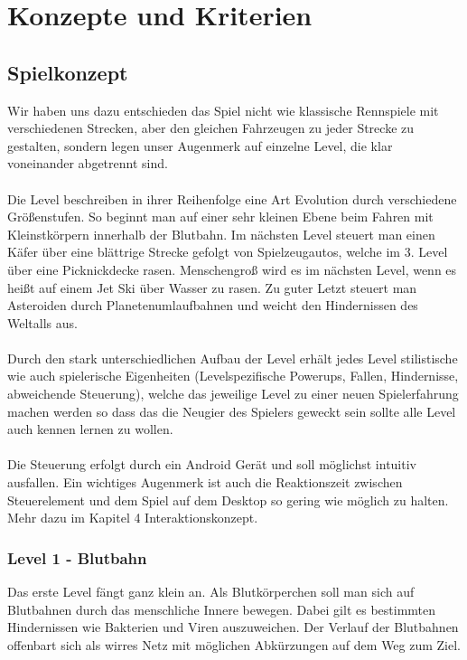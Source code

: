 ﻿\section{Konzepte und Kriterien}

\subsection{Spielkonzept}

Wir haben uns dazu entschieden das Spiel nicht wie klassische Rennspiele mit verschiedenen Strecken, aber den gleichen Fahrzeugen zu jeder Strecke zu gestalten, sondern legen unser Augenmerk auf einzelne Level, die klar voneinander abgetrennt sind.\\
\\
Die Level beschreiben in ihrer Reihenfolge eine Art Evolution durch verschiedene Größenstufen. So beginnt man auf einer sehr kleinen Ebene beim Fahren mit Kleinstkörpern innerhalb der Blutbahn. Im nächsten Level steuert man einen Käfer über eine blättrige Strecke gefolgt von Spielzeugautos, welche im 3. Level über eine Picknickdecke rasen. Menschengroß wird es im nächsten Level, wenn es heißt auf einem Jet Ski über Wasser zu rasen. Zu guter Letzt steuert man Asteroiden durch Planetenumlaufbahnen und weicht den Hindernissen des Weltalls aus.\\
\\
Durch den stark unterschiedlichen Aufbau der Level erhält jedes Level stilistische wie auch spielerische Eigenheiten (Levelspezifische Powerups, Fallen, Hindernisse, abweichende Steuerung), welche das jeweilige Level zu einer neuen Spielerfahrung machen werden so dass das die Neugier des Spielers geweckt sein sollte alle Level auch kennen lernen zu wollen.\\
\\
Die Steuerung erfolgt durch ein Android Gerät und soll möglichst intuitiv ausfallen. Ein wichtiges Augenmerk ist auch die Reaktionszeit zwischen Steuerelement und dem Spiel auf dem Desktop so gering wie möglich zu halten. Mehr dazu im Kapitel 4 Interaktionskonzept.\\

\subsubsection{Level 1 - Blutbahn}

Das erste Level fängt ganz klein an. Als Blutkörperchen soll man sich auf Blutbahnen durch das menschliche Innere bewegen. Dabei gilt es bestimmten Hindernissen wie Bakterien und Viren auszuweichen. Der Verlauf der Blutbahnen offenbart sich als wirres Netz mit möglichen Abkürzungen auf dem Weg zum Ziel.


